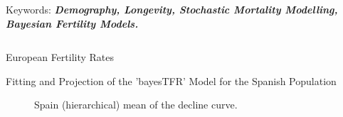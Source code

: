 \documentclass[]{beamer}
\begin{document}
\begin{frame}{\vspace{1ex}\hfill Keywords: \bfseries \textit{Demography, Longevity, Stochastic Mortality Modelling, Bayesian Fertility Models.}}
\begin{columns}[t]
\begin{block}{European Fertility Rates}
\begin{minipage}{.98\columnwidth}
\begin{block}{Fitting and Projection of the ’bayesTFR’ Model for the Spanish Population}
					\begin{figure}[h]
\begin{minipage}[b]{.5\textwidth}
\centering
{}
\caption{Spanish Fertility Rate Projections. \textit{}}
\end{minipage}
\hfill
\begin{minipage}[b]{.48\textwidth}
\centering
\hspace{-1.25cm}
\caption{\small Spain (hierarchical) mean of the decline curve. \textit{}}
\end{minipage}

\end{figure}
\end{block}
\end{minipage}
\end{block}
\end{columns}
\end{frame}
\end{document}
